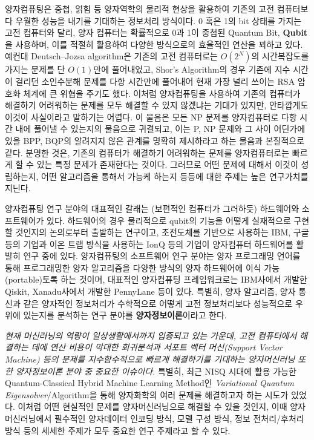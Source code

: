 \quad 양자컴퓨팅은 중첩, 얽힘 등 양자역학의 물리적 현상을 활용하여 기존의 고전 컴퓨터보다 우월한 성능을 내기를 기대하는 정보처리 방식이다. 0 혹은 1의 bit 상태를 가지는 고전 컴퓨터와 달리, 양자 컴퓨터는 확률적으로 0과 1이 중첩된 Quantum Bit, \textbf{Qubit}을 사용하며, 이를 적절히 활용하여 다양한 방식으로의 효율적인 연산을 꾀하고 있다. 예컨대 Deutsch–Jozsa algorithm은 기존의 고전 컴퓨터로는 \( O(2^N) \)의 시간복잡도를 가지는 문제를 단 \( O(1) \)만에 풀어내었고, Shor's Algorithm의 경우 기존에 지수 시간이 걸리던 소인수분해 문제를 다항 시간만에 풀어내어 현재 가장 널리 쓰이는 RSA 암호화 체계에 큰 위협을 주기도 했다. 이처럼 양자컴퓨팅을 사용하여 기존의 컴퓨터가 해결하기 어려워하는 문제를 모두 해결할 수 있지 않겠냐는 기대가 있지만, 안타깝게도 이것이 사실이라고 말하기는 어렵다. 이 물음은 모든 NP 문제를 양자컴퓨터로 다항 시간 내에 풀어낼 수 있는지의 물음으로 귀결되고, 이는 P, NP 문제와 그 사이 어딘가에 있을 BPP, BQP의 알려지지 않은 관계를 명확히 제시하라고 하는 물음과 본질적으로 같다. 분명한 것은, 기존의 컴퓨터가 해결하기 어려워하는 문제를 양자컴퓨터로는 빠르게 할 수 있는 특정 문제가 존재한다는 것이다. 그러므로 어떤 문제에 대해서 이것이 성립하는지, 어떤 알고리즘을 통해서 가능케 하는지 등등에 대한 주제는 높은 연구가치를 지닌다.

양자컴퓨팅 연구 분야의 대표적인 갈래는 (보편적인 컴퓨터가 그러하듯) 하드웨어와 소프트웨어가 있다. 하드웨어의 경우 물리적으로 qubit의 기능을 어떻게 실재적으로 구현할 것인지의 논의로부터 출발하는 연구이고, 초전도체를 기반으로 사용하는 IBM, 구글 등의 기업과 이온 트랩 방식을 사용하는 IonQ 등의 기업이 양자컴퓨터 하드웨어를 활발히 연구 중에 있다. 양자컴퓨팅의 소프트웨어 연구 분야는 양자 프로그래밍 언어를 통해 프로그래밍한 양자 알고리즘을 다양한 방식의 양자 하드웨어에 이식 가능(portable)토록 하는 것이며, 대표적인 양자컴퓨팅 프레임워크로는 IBM사에서 개발한 Qiskit, Xanadu사에서 개발한 PennyLane 등이 있다. 특별히, 양자 알고리즘, 양자 통신과 같은 양자적인 정보처리가 수학적으로 어떻게 고전 정보처리보다 성능적으로 우위에 있는지를 분석하는 연구 분야를 \textbf{양자정보이론}이라고 한다.

\textit{현재 머신러닝의 역량이 일상생활에서까지 입증되고 있는 가운데, 고전 컴퓨터에서 해결하는 데에 연산 비용이 막대한 회귀분석과 서포트 벡터 머신(Support Vector Machine) 등의 문제를 지수함수적으로 빠르게 해결하기를 기대하는 양자머신러닝 또한 양자정보이론 분야 중 중요한 이슈이다. } 특별히, 최근 NISQ 시대에 활용 가능한 Quantum-Classical Hybrid Machine Learning Method인 \textit{Variational Quantum Eigensolver}/Algorithm을 통해 양자화학의 여러 문제를 해결하고자 하는 시도가 있었다. 이처럼 어떤 현실적인 문제를 양자머신러닝으로 해결할 수 있을 것인지, 이때 양자머신러닝에서 필수적인 양자데이터 인코딩 방식, 모델 구성 방식, 정보 전처리/후처리 방식 등의 세세한 주제가 모두 중요한 연구 주제라고 할 수 있다.

